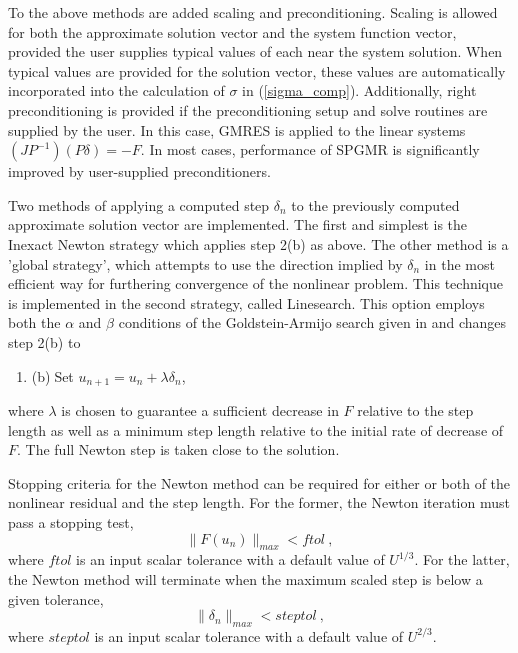 To the above methods are added scaling and preconditioning. Scaling is allowed
for both the approximate solution vector and the system function vector, 
provided the user supplies typical values of each near the system solution.
When typical values are provided for the solution vector, these values are 
automatically incorporated into the calculation of $\sigma$ in
(\ref{sigma_comp}).
Additionally, right preconditioning is provided if the preconditioning 
setup and solve routines are supplied by the user.  In this case,
GMRES is applied to the linear systems $(JP^{-1})(P\delta) = -F$.
In most cases, performance of SPGMR is significantly improved by user-supplied 
preconditioners.  

Two methods of applying a computed step $\delta_n$ to the previously computed
approximate solution vector are implemented.  The 
first and simplest is the Inexact Newton strategy which applies step 2(b) 
as above.  
The other method is a 'global strategy',
which attempts to use the direction implied by $\delta_n$ 
in the most efficient way for furthering convergence of the nonlinear problem. 
This technique 
is implemented in the second strategy, called Linesearch.  This option
employs both the $\alpha$ and $\beta$ conditions of the Goldstein-Armijo
search given in \cite{DeSc:96} and changes step 2(b) to
\begin{enumerate}
\addtocounter{enumi}{1}
\item{(b)$\;$Set $u_{n+1} = u_n + \lambda \delta_n$},
\end{enumerate}
where $\lambda$ is chosen to guarantee a sufficient decrease in $F$ 
relative to the step length as well as a minimum step length relative 
to the initial rate of decrease of $F$.  The full Newton step is taken
close to the solution.

Stopping criteria for the Newton method can be required for either or 
both of the nonlinear residual and the step length.  For the former, 
the Newton iteration must pass a stopping test,
\[ \|F(u_n)\|_{max} < ftol ~, \]
where $ftol$ is an input scalar tolerance with a default value of $U^{1/3}$.
For the latter, the Newton method will terminate when the maximum scaled step
is below a given tolerance,
\[ \|\delta_n\|_{max} < steptol ~, \]
where $steptol$ is an input scalar tolerance with a default value of 
$U^{2/3}$.

